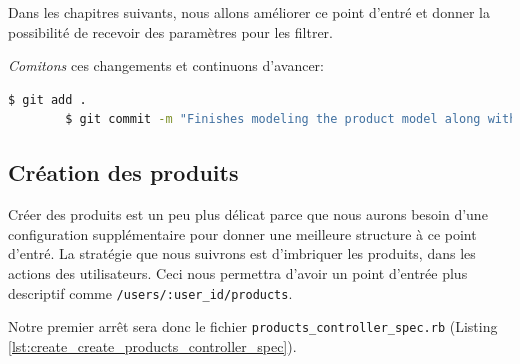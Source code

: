 \documentclass[]{report}
\begin{document}
      Dans les chapitres suivants, nous allons améliorer ce point d'entré et donner la possibilité de recevoir des paramètres pour les filtrer.

      \textit{Comitons} ces changements et continuons d'avancer:

      \begin{scriptsize}
        \begin{lstlisting}[language=bash]
        $ git add .
        $ git commit -m "Finishes modeling the product model along with user associations"
        \end{lstlisting}
      \end{scriptsize}

    \subsection{Création des produits}\label{subsec:create_products}

      Créer des produits est un peu plus délicat parce que nous aurons besoin d'une configuration supplémentaire pour donner une meilleure structure à ce point d'entré. La stratégie que nous suivrons est d'imbriquer les produits, dans les actions des utilisateurs. Ceci nous permettra d'avoir  un point d'entrée plus descriptif comme \verb|/users/:user_id/products|.

      Notre premier arrêt sera donc le fichier \verb|products_controller_spec.rb| (Listing \ref{lst:create_create_products_controller_spec}).
\end{document}
